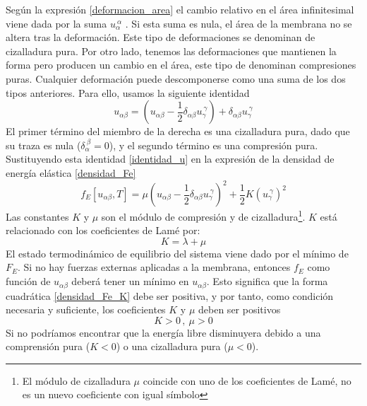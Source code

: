 Según la expresión \eqref{deformacion_area} el cambio relativo en el área infinitesimal
viene dada por la suma $u_{\alpha}^{\ \alpha}$ . Si esta suma es nula, el área
de la membrana no se altera tras la deformación. Este tipo de deformaciones se
denominan de cizalladura pura. Por otro lado, tenemos las deformaciones que
mantienen la forma pero producen un cambio en el área, este tipo de denominan
compresiones puras. Cualquier deformación puede descomponerse como una suma de
los dos tipos anteriores. Para ello, usamos la siguiente identidad
\begin{equation}\label{identidad_u}
u_{\alpha\beta}=(u_{\alpha\beta}-\frac{1}{2}\delta_{\alpha\beta}u_{\gamma}^{\
  \gamma})+\delta_{\alpha\beta}u_{\gamma}^{\ \gamma}
\end{equation}
El primer término del miembro de la derecha es una cizalladura pura, dado que
su traza es nula ($\delta_{\alpha}^{\ \beta}=0$), y el segundo término es una
compresión pura. Sustituyendo esta identidad \eqref{identidad_u} en la expresión de la densidad de
energía elástica \eqref{densidad_Fe}
\begin{equation}\label{densidad_Fe_K}
f_E[u_{\alpha\beta},T]=
\mu \left(u_{\alpha\beta}-\frac{1}{2}\delta_{\alpha\beta}u_{\gamma}^{\ \gamma}\right)^2+
\frac{1}{2}K(u_{\gamma}^{\ \gamma})^2
\end{equation}
Las constantes $K$ y $\mu$ son el módulo de compresión y de
cizalladura\footnote{El módulo de cizalladura $\mu$ coincide con uno de los
  coeficientes de Lamé, no es un nuevo coeficiente con igual símbolo}. $K$
está relacionado con los coeficientes de Lamé por:
\begin{equation}
K=\lambda+\mu
\end{equation}
El estado termodinámico de equilibrio del sistema viene dado por el mínimo de
$F_E$. Si no hay fuerzas externas aplicadas a la membrana, entonces $f_E$ como
función de $u_{\alpha\beta}$ deberá tener un mínimo en $u_{\alpha\beta}$. Esto
significa que la forma cuadrática \eqref{densidad_Fe_K} debe ser positiva, y por
tanto, como condición necesaria y suficiente, los coeficientes $K$ y $\mu$ deben ser positivos
\begin{equation}
K>0\, ,\ \mu>0
\end{equation}
Si no podríamos encontrar que la energía libre disminuyera debido a una
comprensión pura ($K<0$) o una cizalladura pura ($\mu<0$).

